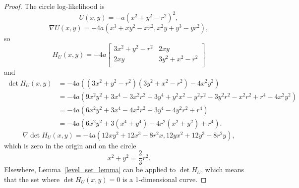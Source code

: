 \documentclass[english,twoside,openright]{HYgraduMLDS}
\begin{document}
\begin{appendices}
\begin{proof}
The circle log-likelihood is
\[
  U(x, y) = -a(x^{2} + y^{2} - r^{2})^{2},
\]
\[
  \nabla U(x, y) = -4a(x^{3} + xy^{2} - xr^{2}, x^{2}y + y^{3} - yr^{2}),
\]
so
\[
  H_{U}(x, y) = -4a
  \begin{bmatrix}
    3x^{2} + y^{2} - r^{2} & 2xy \\
    2xy & 3y^{2} + x^{2} - r^{2} \\
  \end{bmatrix}
\]
and
\begin{align*}
  \det H_{U}(x, y) &= -4a((3x^{2} + y^{2} - r^{2})(3y^{2} + x^{2} - r^{2})
  - 4x^{2}y^{2})
  \\&= -4a(9x^{2}y^{2} + 3x^{4} - 3x^{2}r^{2} + 3y^{4} + y^{2}x^{2} -y^{2}r^{2}
  - 3y^{2}r^{2} - x^{2}r^{2} + r^{4} - 4x^{2}y^{2})
  \\&= -4a(6x^{2}y^{2} + 3x^{4} - 4x^{2}r^{2} + 3y^{4} - 4y^{2}r^{2} + r^{4})
  \\&= -4a(6x^{2}y^{2} + 3(x^{4} + y^{4}) - 4r^{2}(x^{2} + y^{2}) + r^{4}).
\end{align*}
\[
  \nabla \det H_{U}(x, y) = -4a(12xy^{2} + 12x^{3} - 8r^{2}x,
  12yx^{2} + 12y^{3} - 8r^{2}y),
\]
which is zero in the origin and on the circle
\[
  x^{2} + y^{2} = \frac{2}{3}r^{2}.
\]
Elsewhere, Lemma~\ref{level_set_lemma} can be applied to \(\det H_{U}\), which
means that the set where \(\det H_{U}(x, y) = 0\) is a 1-dimensional curve.
\end{proof}
\end{appendices}
\end{document}
